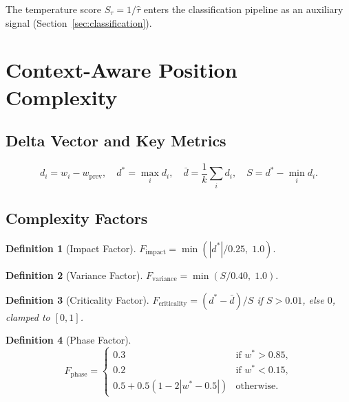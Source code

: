 \documentclass[11pt,a4paper]{article}
\newtheorem{definition}{Definition}
\begin{document}
The temperature score $S_{\tau} = 1/\hat{\tau}$ enters the classification
pipeline as an auxiliary signal (Section~\ref{sec:classification}).


\section{Context-Aware Position Complexity}
\label{sec:complexity}

\subsection{Delta Vector and Key Metrics}

\begin{equation}
    d_i = w_i - w_{\text{prev}}, \quad
    d^* = \max_i d_i, \quad
    \bar{d} = \frac{1}{k}\sum_{i} d_i, \quad
    S = d^* - \min_i d_i.
\end{equation}

\subsection{Complexity Factors}

\begin{definition}[Impact Factor]
$F_{\text{impact}} = \min\!\left(|d^*| / 0.25,\; 1.0\right).$
\end{definition}

\begin{definition}[Variance Factor]
$F_{\text{variance}} = \min\!\left(S / 0.40,\; 1.0\right).$
\end{definition}

\begin{definition}[Criticality Factor]
$F_{\text{criticality}} = (d^* - \bar{d}) / S$ if $S > 0.01$, else $0$,
clamped to $[0,1]$.
\end{definition}

\begin{definition}[Phase Factor]
\begin{equation}
    F_{\text{phase}} = \begin{cases}
        0.3 & \text{if } w^* > 0.85, \\
        0.2 & \text{if } w^* < 0.15, \\
        0.5 + 0.5(1 - 2|w^* - 0.5|) & \text{otherwise}.
    \end{cases}
\end{equation}
\end{definition}
\end{document}
